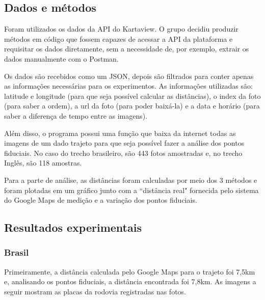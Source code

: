 \documentclass{article}
\begin{document}
\subsection{Dados e métodos}

\qquad Foram utilizados os dados da API do Kartaview. O grupo decidiu produzir métodos em código que fossem capazes de acessar a API da plataforma e requisitar os dados diretamente, sem a necessidade de, por exemplo, extrair os dados manualmente com o Postman.

\quad Os dados são recebidos como um JSON, depois são filtrados para conter apenas as informações necessárias para os experimentos. As informações utilizadas são: latitude e longitude (para que seja possível calcular as distâncias), o index da foto (para saber a ordem), a url da foto (para poder baixá-la) e a data e horário (para saber a diferença de tempo entre as imagens).

\quad Além disso, o programa possui uma função que baixa da internet todas as imagens de um dado trajeto para que seja possível fazer a análise dos pontos fiduciais. No caso do trecho brasileiro, são 443 fotos amostradas e, no trecho Inglês, são 118 amostras.

\quad Para a parte de análise, as distâncias foram calculadas por meio dos 3 métodos e foram plotadas em um gráfico junto com a ``distância real" fornecida pelo sistema do Google Maps de medição e a variação dos pontos fiduciais.

\subsection{Resultados experimentais}

\subsubsection{Brasil}

\qquad Primeiramente, a distância calculada pelo Google Maps para o trajeto foi 7,5km e, analisando os pontos fiduciais, a distância encontrada foi 7,8km. As imagens a seguir mostram as placas da rodovia registradas nas fotos.
\end{document}
